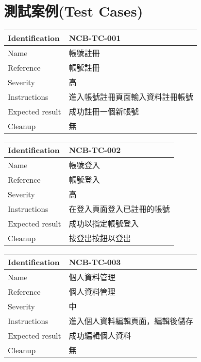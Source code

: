 \documentclass{article}
\begin{document}
\newpage

\section[測試案例(TEST CASES)]{測試案例(Test Cases)}

\begin{tabularx}{\textwidth}{| A{0.3\textwidth} | X |}
	\hline
	Identification  & NCB-TC-001       \\ \hline
	Name            & 帳號註冊             \\ \hline
	Reference       & 帳號註冊             \\ \hline
	Severity        & 高                \\ \hline
	Instructions    & 進入帳號註冊頁面輸入資料註冊帳號 \\ \hline
	Expected result & 成功註冊一個新帳號        \\ \hline
	Cleanup         & 無                \\ \hline
\end{tabularx}

\bigskip

\begin{tabularx}{\textwidth}{| A{0.3\textwidth} | X |}
	\hline
	Identification  & NCB-TC-002    \\ \hline
	Name            & 帳號登入          \\ \hline
	Reference       & 帳號登入          \\ \hline
	Severity        & 高             \\ \hline
	Instructions    & 在登入頁面登入已註冊的帳號 \\ \hline
	Expected result & 成功以指定帳號登入     \\ \hline
	Cleanup         & 按登出按鈕以登出      \\ \hline
\end{tabularx}

\bigskip

\begin{tabularx}{\textwidth}{| A{0.3\textwidth} | X |}
	\hline
	Identification  & NCB-TC-003       \\ \hline
	Name            & 個人資料管理           \\ \hline
	Reference       & 個人資料管理           \\ \hline
	Severity        & 中                \\ \hline
	Instructions    & 進入個人資料編輯頁面，編輯後儲存 \\ \hline
	Expected result & 成功編輯個人資料         \\ \hline
	Cleanup         & 無                \\ \hline
\end{tabularx}
\end{document}
